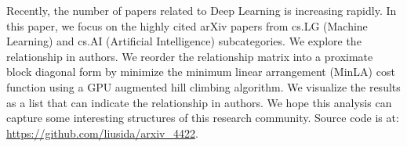 Recently, the number of papers related to Deep Learning is increasing rapidly.
In this paper, we focus on the highly cited arXiv papers from cs.LG (Machine Learning) and cs.AI (Artificial Intelligence) subcategories.
We explore the relationship in authors.
We reorder the relationship matrix into a proximate block diagonal form by minimize the minimum linear arrangement (MinLA) cost function using a GPU augmented hill climbing algorithm.
We visualize the results as a list that can indicate the relationship in authors.
We hope this analysis can capture some interesting structures of this research community.
Source code is at: \url{https://github.com/liusida/arxiv_4422}.